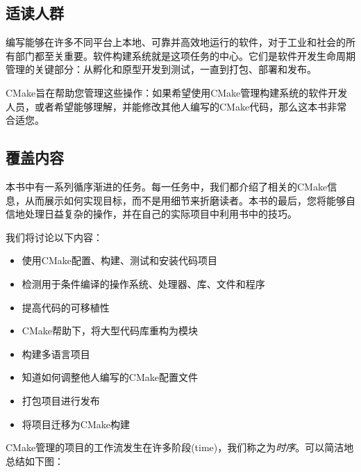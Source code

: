 \subsection{适读人群}

编写能够在许多不同平台上本地、可靠并高效地运行的软件，对于工业和社会的所有部门都至关重要。软件构建系统就是这项任务的中心。它们是软件开发生命周期管理的关键部分：从孵化和原型开发到测试，一直到打包、部署和发布。

CMake旨在帮助您管理这些操作：如果希望使用CMake管理构建系统的软件开发人员，或者希望能够理解，并能修改其他人编写的CMake代码，那么这本书非常合适您。

\subsection{覆盖内容}

本书中有一系列循序渐进的任务。每一任务中，我们都介绍了相关的CMake信息，从而展示如何实现目标，而不是用细节来折磨读者。本书的最后，您将能够自信地处理日益复杂的操作，并在自己的实际项目中利用书中的技巧。

我们将讨论以下内容：

\begin{itemize}
\item 使用CMake配置、构建、测试和安装代码项目

\item 检测用于条件编译的操作系统、处理器、库、文件和程序

\item 提高代码的可移植性

\item CMake帮助下，将大型代码库重构为模块

\item 构建多语言项目

\item 知道如何调整他人编写的CMake配置文件

\item 打包项目进行发布

\item 将项目迁移为CMake构建

\end{itemize}

CMake管理的项目的工作流发生在许多阶段(time)，我们称之为\emph{时序}。可以简洁地总结如下图：


